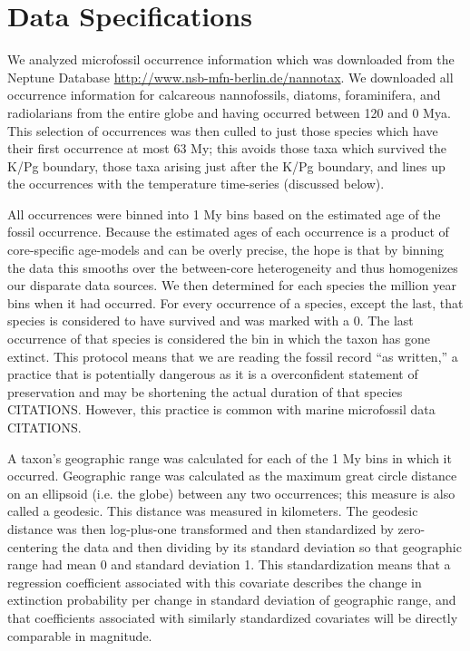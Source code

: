 \documentclass[12pt,letterpaper]{article}
\begin{document}
\section{Data Specifications}

We analyzed microfossil occurrence information which was downloaded from the Neptune Database \url{http://www.nsb-mfn-berlin.de/nannotax}. We downloaded all occurrence information for calcareous nannofossils, diatoms, foraminifera, and radiolarians from the entire globe and having occurred between 120 and 0 Mya. This selection of occurrences was then culled to just those species which have their first occurrence at most 63 My; this avoids those taxa which survived the K/Pg boundary, those taxa arising just after the K/Pg boundary, and lines up the occurrences with the temperature time-series (discussed below).

All occurrences were binned into 1 My bins based on the estimated age of the fossil occurrence. Because the estimated ages of each occurrence is a product of core-specific age-models and can be overly precise, the hope is that by binning the data this smooths over the between-core heterogeneity and thus homogenizes our disparate data sources. We then determined for each species the million year bins when it had occurred. For every occurrence of a species, except the last, that species is considered to have survived and was marked with a 0. The last occurrence of that species is considered the bin in which the taxon has gone extinct. This protocol means that we are reading the fossil record ``as written,'' a practice that is potentially dangerous as it is a overconfident statement of preservation and may be shortening the actual duration of that species CITATIONS. However, this practice is common with marine microfossil data CITATIONS.

A taxon's geographic range was calculated for each of the 1 My bins in which it occurred. Geographic range was calculated as the maximum great circle distance on an ellipsoid (i.e. the globe) between any two occurrences; this measure is also called a geodesic. This distance was measured in kilometers. The geodesic distance was then log-plus-one transformed and then standardized by zero-centering the data and then dividing by its standard deviation so that geographic range had mean 0 and standard deviation 1. This standardization means that a regression coefficient associated with this covariate describes the change in extinction probability per change in standard deviation of geographic range, and that coefficients associated with similarly standardized covariates will be directly comparable in magnitude.
\end{document}
